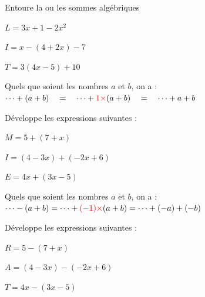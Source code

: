 \documentclass[a4paper,10pt]{report}
\begin{document}
\vspace{-2mm}
\begin{ex}
Entoure la ou les sommes algébriques

\medskip
\noindent \begin{minipage}{6cm}
$L=3x+1-2x^2$
\end{minipage}
\begin{minipage}{6cm}
$I=x-(4+2x)-7$
\end{minipage}
\begin{minipage}{6cm}
$T=3(4x-5)+10$
\end{minipage}
\end{ex}

\vspace{-2mm}
\begin{prop}

Quels que soient les nombres $a$ et $b$, on a : \hspace{1cm}$ \dots + ( a + b ) \quad = \quad \dots + \textcolor{red}{1 \times} ( a + b ) \quad = \quad \dots + a + b $
\end{prop}

\vspace{-2mm}
\begin{ex}
Développe les expressions suivantes : 

\hspace{0.5cm}\begin{minipage}{5cm}
$M = 5 + (7 + x)$
\end{minipage}
\begin{minipage}{7cm}
$I = (4 - 3x) + (-2x + 6)$
\end{minipage}
\begin{minipage}{6cm}
$E = 4x + (3x - 5)$
\end{minipage}

\noindent\grandscarreaux{\linewidth}{2.4cm}
\end{ex} 
  
\begin{prop}

Quels que soient les nombres $a$ et $b$, on a : \hspace{1cm}$ \dots - ( a + b ) = \dots + \textcolor{red}{(-1) \times} ( a + b ) = \dots + (-a) + (-b) $
\end{prop}

\vspace{-2mm}
\begin{ex}
Développe les expressions suivantes : 

\hspace{0.5cm}\begin{minipage}{5cm}
$R = 5 - (7 + x)$
\end{minipage}
\begin{minipage}{7cm}
$A = (4 - 3x) - (-2x + 6)$
\end{minipage}
\begin{minipage}{6cm}
$T = 4x - (3x - 5)$
\end{minipage}

\noindent\grandscarreaux{\linewidth}{2.4cm}
\end{ex} 
  
\end{document}
